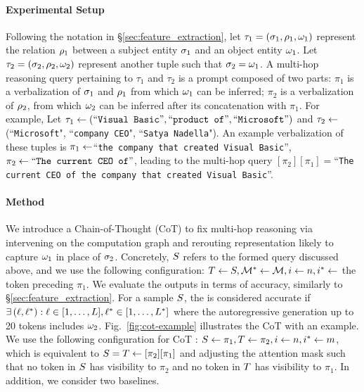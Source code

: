 \documentclass{article}
\theoremstyle{plain}
\theoremstyle{definition}
\theoremstyle{remark}
\begin{document}
\paragraph{Experimental Setup} Following the notation in \S\ref{sec:feature_extraction}, let $\tau_1 = (\sigma_1, \rho_1, \omega_1)$ represent the relation $\rho_1$ between a subject entity $\sigma_1$ and an object entity $\omega_1$. Let $\tau_2 = (\sigma_2, \rho_2, \omega_2)$ represent another tuple such that $\sigma_2 = \omega_1$. A multi-hop reasoning query pertaining to $\tau_1$ and $\tau_2$ is a prompt composed of two parts: $\pi_1$ is a verbalization of $\sigma_1$ and $\rho_1$ from which $\omega_1$ can be inferred; $\pi_2$ is a verbalization of $\rho_2$, from which $\omega_2$ can be inferred after its concatenation with $\pi_1$. For example, Let $\tau_1 \leftarrow (``\texttt{Visual Basic}", ``\texttt{product of}", ``\texttt{Microsoft}")$ and $\tau_2 \leftarrow$ (``\texttt{Microsoft}", ``\texttt{company CEO}", ``\texttt{Satya Nadella}"). An example verbalization of these tuples is $\pi_1 \leftarrow $``\texttt{the company that created Visual Basic}'', $\pi_2 \leftarrow ``\texttt{The current CEO of}"$, leading to the multi-hop query $[\pi_2][\pi_1]=$``\texttt{The current CEO of the company that created Visual Basic}''. 


\paragraph{Method} We introduce a Chain-of-Thought (CoT) \methodName{} to fix multi-hop reasoning via intervening on the computation graph and rerouting representation likely to capture $\omega_1$ in place of $\sigma_2$. Concretely, $S$ refers to the formed query discussed above, and we use the following configuration: $T \leftarrow S, \mathcal{M}^* \leftarrow \mathcal{M}, i \leftarrow n, i^* \leftarrow$ the token preceding $\pi_1$. 
We evaluate the outputs in terms of accuracy, similarly to \S\ref{sec:feature_extraction}. For a sample $S$, the \methodName{} is considered accurate if $ \exists \, (\ell, \ell^*) : \ell \in [1, \ldots, L], \ell^* \in [1, \ldots, L^*]$ where the autoregressive generation up to 20 tokens includes $\omega_2$.
Fig.~\ref{fig:cot-example} illustrates the CoT \methodName{} with an example. We use the following configuration for CoT \methodName{}: $S \leftarrow \pi_1, T \leftarrow \pi_2, i \leftarrow n, i^* \leftarrow m$, which is equivalent to $S = T \leftarrow [\pi_2][\pi_1]$ and adjusting the attention mask such that no token in $S$ has visibility to $\pi_2$ and no token in $T$ has visibility to $\pi_1$. In addition, we consider two baselines. 
\end{document}
